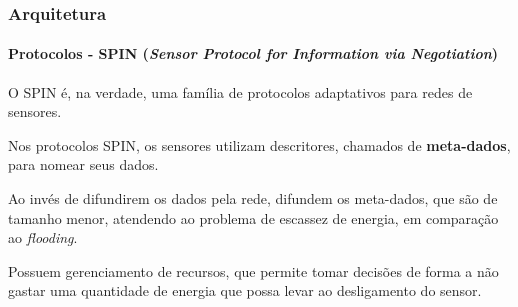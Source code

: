 \documentclass[notes]{beamer}
\begin{document}
\begin{frame}
\frametitle{Arquitetura}
\framesubtitle{Protocolos - SPIN (\textit{Sensor Protocol for Information via Negotiation})}

\begin{block}

O SPIN é, na verdade, uma família de protocolos adaptativos para redes de sensores.

\end{block} \pause

\begin{block}

Nos protocolos SPIN, os sensores utilizam descritores, chamados de \textbf{meta-dados}, para nomear seus dados.

\end{block} \pause

\begin{block}

Ao invés de difundirem os dados pela rede, difundem os meta-dados, que são de tamanho menor, atendendo ao problema de escassez de energia, em comparação ao \textit{flooding}.

\end{block} \pause

\begin{block}

Possuem gerenciamento de recursos, que permite tomar decisões de forma a não gastar uma quantidade de energia que possa levar ao desligamento do sensor.

\end{block}

\end{frame}
\end{document}

